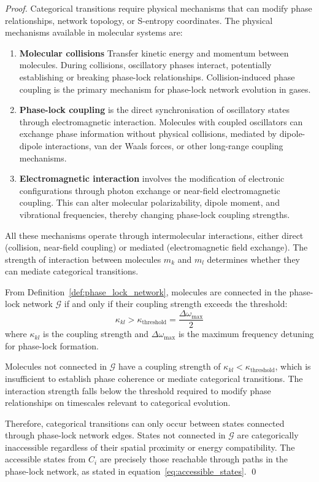 \documentclass[12pt,a4paper]{article}
\theoremstyle{definition}
\theoremstyle{remark}
\newcommand{\phaselockgraph}{\mathcal{G}}
\begin{document}
\begin{proof}
Categorical transitions require physical mechanisms that can modify phase relationships, network topology, or S-entropy coordinates. The physical mechanisms available in molecular systems are:

\begin{enumerate}
    \item \textbf{Molecular collisions} Transfer kinetic energy and momentum between molecules. During collisions, oscillatory phases interact, potentially establishing or breaking phase-lock relationships. Collision-induced phase coupling is the primary mechanism for phase-lock network evolution in gases.

    \item \textbf{Phase-lock coupling} is the direct synchronisation of oscillatory states through electromagnetic interaction. Molecules with coupled oscillators can exchange phase information without physical collisions, mediated by dipole-dipole interactions, van der Waals forces, or other long-range coupling mechanisms.

    \item \textbf{Electromagnetic interaction} involves the modification of electronic configurations through photon exchange or near-field electromagnetic coupling. This can alter molecular polarizability, dipole moment, and vibrational frequencies, thereby changing phase-lock coupling strengths.
\end{enumerate}

All these mechanisms operate through intermolecular interactions, either direct (collision, near-field coupling) or mediated (electromagnetic field exchange). The strength of interaction between molecules $m_k$ and $m_l$ determines whether they can mediate categorical transitions.

From Definition~\ref{def:phase_lock_network}, molecules are connected in the phase-lock network $\phaselockgraph$ if and only if their coupling strength exceeds the threshold:
\begin{equation}
\kappa_{kl} > \kappa_{\text{threshold}} = \frac{\Delta\omega_{\text{max}}}{2}
\end{equation}
where $\kappa_{kl}$ is the coupling strength and $\Delta\omega_{\text{max}}$ is the maximum frequency detuning for phase-lock formation.

Molecules not connected in $\phaselockgraph$ have a coupling strength of $\kappa_{kl} < \kappa_{\text{threshold}}$, which is insufficient to establish phase coherence or mediate categorical transitions. The interaction strength falls below the threshold required to modify phase relationships on timescales relevant to categorical evolution.

Therefore, categorical transitions can only occur between states connected through phase-lock network edges. States not connected in $\phaselockgraph$ are categorically inaccessible regardless of their spatial proximity or energy compatibility. The accessible states from $C_i$ are precisely those reachable through paths in the phase-lock network, as stated in equation~\eqref{eq:accessible_states}. \qed
\end{proof}
\end{document}
